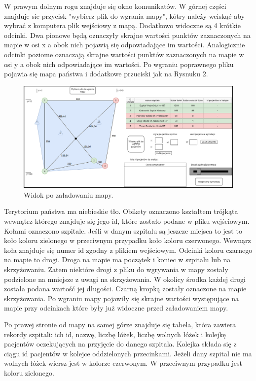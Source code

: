 \documentclass[10pt,a4paper]{article}
\begin{document}
W prawym dolnym rogu znajduje się okno komunikatów. W górnej części znajduje sie przycisk "wybierz plik do wgrania mapy", kótry należy wciskąć aby wybrać z komputera plik wejściowy z mapą. Dodatkowo widoczne są 4 krótkie odcinki. Dwa pionowe będą oznaczyły skrajne wartości punktów zaznaczonych na mapie w osi x a obok nich pojawią się odpowiadające im wartości. Analogicznie odcinki poziome oznaczają skrajne wartości punktów zaznaczonych na mapie w osi y a obok nich odpowiadające im wartości. Po wgraniu poprawnego pliku pojawia się mapa państwa i dodatkowe przuciski jak na Rysnuku 2.

\begin{figure}[h]
  \includegraphics[width=\linewidth]{./images/widok_z_mapa.png}
  \caption{Widok po załadowaniu mapy.}
  \label{fig:GUImap}
\end{figure}

Terytorium państwa ma niebieskie tło. Obikety oznaczono kształtem trójkąta wewnątrz którego znajduje się jego id, które zostało podane w pliku wejściowym. Kołami oznaczono szpitale. Jeśli w danym szpitalu są jeszcze miejsca to jest to koło koloru zielonego w przeciwnym przypadku koło koloru czerwonego. Wewnąrz koła znajduje się numer id zgodny z plikiem wejściowym. Odcinki koloru czarnego na mapie to drogi. Droga na mapie ma początek i koniec w szpitalu lub na skrzyżowaniu. Zatem niektóre drogi z pliku do wgrywania w mapy zostały podzielone na mniejsze z uwagi na skrzyżowania. W okolicy środka każdej drogi została podana wartość jej długości. Czarną kropką zostały oznaczone na mapie skrzyżowania. Po wgraniu mapy pojawiły się skrajne wartości występujące na mapie przy odcinkach które były już widoczne przed załadowaniem mapy.

Po prawej stronie od mapy na samej górze znajduje się tabela, która zawiera rekordy szpitali: ich id, nazwę, liczbę łóżek, liczbę wolnych łóżek i kolejkę pacjentów oczekujących na przyjęcie do danego szpitala. Kolejka składa się z ciągu id pacjentów w kolejce oddzielonych przecinkami. Jeżeli dany szpital nie ma wolnych łóżek wiersz jest w kolorze czerwonym. W przeciwnym przypadku jest koloru zielonego.
\end{document}
